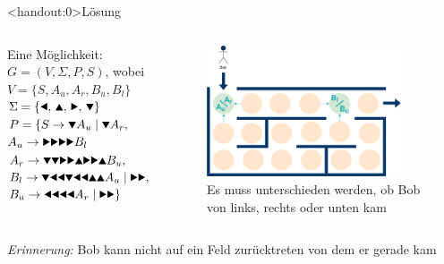{
\begin{frame}<handout:0>{Lösung}
    \begin{columns}
    \begin{alertblock}{Eine Möglichkeit:}
         $G = (V, \Sigma, P, S)$, wobei \\
         $V = \{S, A_u, A_r, B_u, B_l\}$ \\
         $\Sigma = \{\text{\Rewind, \MoveUp, \Forward, \MoveDown}\}$ \\
         $P = \{S \rightarrow \text\MoveDown A_u \mid \text\MoveDown A_r,$\\
         \qquad\; $A_u \rightarrow \text{\Forward\Forward\Forward\Forward} B_l$\\
         \qquad\; $A_r \rightarrow \text{\MoveDown\MoveDown\Forward\Forward\MoveUp\Forward\Forward\MoveUp} B_u,$\\
         \qquad\; $B_l \rightarrow \text{\MoveDown\Rewind\Rewind\MoveDown\Rewind\Rewind\MoveUp\MoveUp} A_u \mid \text{\Forward\Forward},$\\
         \qquad\; $B_u \rightarrow \text{\Rewind\Rewind\Rewind\Rewind} A_r \mid \text{\Forward\Forward}\}$
    \end{alertblock}
    \begin{figure}
        \centering
        \includegraphics[width=0.9\textwidth]{../figures/GBeispielHowTo.png}
        \caption{Es muss unterschieden werden, ob Bob von links, rechts oder unten kam}
        
    \end{figure}
    \end{columns}
    \small\emph{Erinnerung:} Bob kann nicht auf ein Feld zurücktreten von dem er gerade kam
\end{frame}
} 

